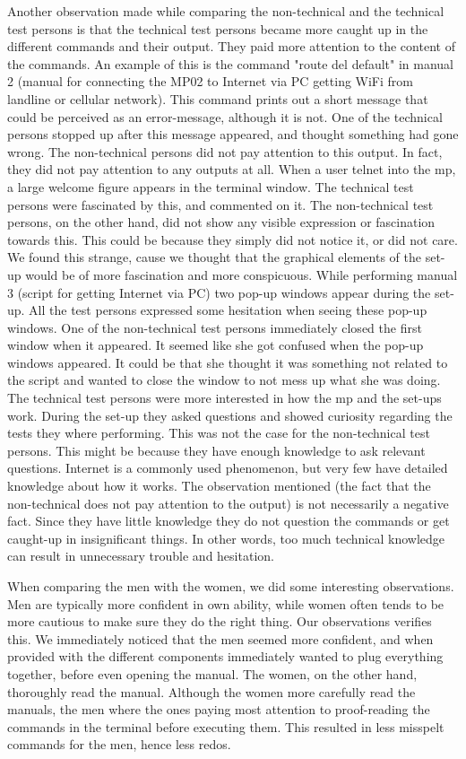 Another observation made while comparing the non-technical and the technical test persons is that the technical test persons became more caught up in the different commands and their output. They paid more attention to the content of the commands. An example of this is the command "route del default" in manual 2 (manual for connecting the MP02 to Internet via PC getting WiFi from landline or cellular network). This command prints out a short message that could be perceived as an error-message, although it is not. One of the technical persons stopped up after this message appeared, and thought something had gone wrong. The non-technical persons did not pay attention to this output. In fact, they did not pay attention to any outputs at all. When a user telnet into the \gls{mp}, a large welcome figure appears in the terminal window. The technical test persons were fascinated by this, and commented on it. The non-technical test persons, on the other hand, did not show any visible expression or fascination towards this. This could be because they simply did not notice it, or did not care. We found this strange, cause we thought that the graphical elements of the set-up would be of more fascination and more conspicuous. While performing manual 3 (script for getting Internet via PC) two pop-up windows appear during the set-up. All the test persons expressed some hesitation when seeing these pop-up windows. One of the non-technical test persons immediately closed the first window when it appeared. It seemed like she got confused when the pop-up windows appeared. It could be that she thought it was something not related to the script and wanted to close the window to not mess up what she was doing. The technical test persons were more interested in how the \gls{mp} and the set-ups work. During the set-up they asked questions and showed curiosity regarding the tests they where performing. This was not the case for the non-technical test persons. This might be because they have enough knowledge to ask relevant questions. Internet is a commonly used phenomenon, but very few have detailed knowledge about how it works. The observation mentioned (the fact that the non-technical does not pay attention to the output) is not necessarily a negative fact. Since they have little knowledge they do not question the commands or get caught-up in insignificant things. In other words, too much technical knowledge can result in unnecessary trouble and hesitation. 

When comparing the men with the women, we did some interesting observations. Men are typically more confident in own ability, while women often tends to be more cautious to make sure they do the right thing. Our observations verifies this. We immediately noticed that the men seemed more confident, and when provided with the different components immediately wanted to plug everything together, before even opening the manual. The women, on the other hand, thoroughly read the manual. Although the women more carefully read the manuals, the men where the ones paying most attention to proof-reading the commands in the terminal before executing them. This resulted in less misspelt commands for the men, hence less redos. 
